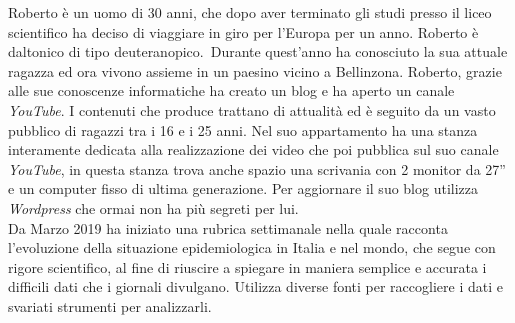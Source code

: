 Roberto è un uomo di 30 anni, che dopo aver terminato gli studi presso il liceo scientifico ha deciso di viaggiare in giro per l'Europa per un anno. Roberto è daltonico di tipo deuteranopico. Durante quest'anno ha conosciuto la sua attuale ragazza ed ora vivono assieme in un paesino vicino a Bellinzona. Roberto, grazie alle sue conoscenze informatiche ha creato un blog e ha aperto un canale \textit{YouTube}. I contenuti che produce trattano di attualità ed è seguito da un vasto pubblico di ragazzi tra i 16 e i 25 anni. Nel suo appartamento ha una stanza interamente dedicata alla realizzazione dei video che poi pubblica sul suo canale \textit{YouTube}, in questa stanza trova anche spazio una scrivania con 2 monitor da 27'' e un computer fisso di ultima generazione. Per aggiornare il suo blog utilizza \textit{Wordpress} che ormai non ha più segreti per lui.\\ 
Da Marzo 2019 ha iniziato una rubrica settimanale nella quale racconta l'evoluzione della situazione epidemiologica in Italia e nel mondo, che segue con rigore scientifico, al fine di riuscire a spiegare in maniera semplice e accurata i difficili dati che i giornali divulgano. Utilizza diverse fonti per raccogliere i dati e svariati strumenti per analizzarli. 

